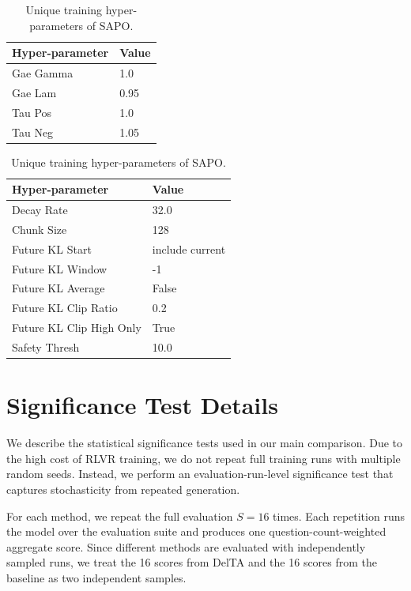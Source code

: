 \documentclass{llmxive}
\begin{document}
\begin{table}[t]  
\begin{center}
\begin{minipage}[t]{0.48\linewidth}
\centering
\begin{tabular}{ll}
\toprule
Hyper-parameter & Value \\
\midrule
Gae Gamma & 1.0 \\
Gae Lam & 0.95 \\
Tau Pos & 1.0 \\
Tau Neg & 1.05 \\
\bottomrule
\end{tabular}
\end{minipage}  
\hfil
\begin{minipage}[t]{0.48\linewidth}
\caption{Unique training hyper-parameters of FIPO.}
\label{tab: FIPO hyper-parameters}
\centering
\begin{tabular}{ll}
\toprule
Hyper-parameter & Value \\
\midrule
Decay Rate & 32.0  \\
Chunk Size & 128 \\
Future KL Start & include current \\
Future KL Window & -1 \\
Future KL Average & False \\
Future KL Clip Ratio & 0.2 \\
Future KL Clip High Only & True \\
Safety Thresh & 10.0 \\
\bottomrule
\end{tabular}
\end{minipage} 
\end{center}
\caption{Unique training hyper-parameters of SAPO.}
\label{tab: SAPO hyper-parameters}
\end{table}

\section{Significance Test Details}
\label{app:sig}

We describe the statistical significance tests used in our main comparison.
Due to the high cost of RLVR training, we do not repeat full training runs with multiple random seeds.
Instead, we perform an evaluation-run-level significance test that captures stochasticity from repeated generation.


For each method, we repeat the full evaluation \(S=16\) times.
Each repetition runs the model over the evaluation suite and produces one question-count-weighted aggregate score.
Since different methods are evaluated with independently sampled runs, we treat the 16 scores from DelTA and the 16 scores from the baseline as two independent samples.
\end{document}
